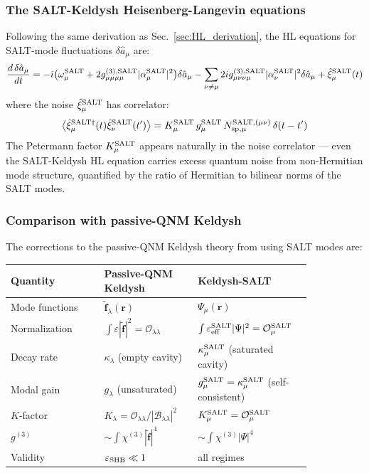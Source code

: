 \documentclass[12pt]{article}
\newcommand{\tf}{\tilde{\mathbf{f}}}
\begin{document}
\subsubsection*{The SALT-Keldysh Heisenberg-Langevin equations}

Following the same derivation as Sec.~\ref{sec:HL_derivation}, the HL
equations for SALT-mode fluctuations $\delta\hat{a}_\mu$ are:
\begin{equation}
  \frac{d\,\delta\hat{a}_\mu}{dt} =
  -i\bigl(\omega_\mu^{\rm SALT} + 2g^{(3),\rm SALT}_{\mu\mu\mu\mu}
  |\alpha_\mu^{\rm SALT}|^2\bigr)\delta\hat{a}_\mu
  - \sum_{\nu\neq\mu}
  2ig^{(3),\rm SALT}_{\mu\nu\nu\mu}|\alpha_\nu^{\rm SALT}|^2\delta\hat{a}_\mu
  + \hat{\xi}_\mu^{\rm SALT}(t)
  \label{eq:HL_SALT}
\end{equation}
where the noise $\hat{\xi}_\mu^{\rm SALT}$ has correlator:
\begin{equation}
  \bigl\langle\hat{\xi}_\mu^{{\rm SALT}\dagger}(t)
  \hat{\xi}_\nu^{\rm SALT}(t')\bigr\rangle
  = K_\mu^{\rm SALT}\,g_\mu^{\rm SALT}\,
  N_{\rm sp,\mu}^{\rm SALT,(\mu\nu)}\,\delta(t-t')
  \label{eq:HL_SALT_noise}
\end{equation}
The Petermann factor $K_\mu^{\rm SALT}$ appears naturally in the noise
correlator --- even the SALT-Keldysh HL equation carries excess quantum
noise from non-Hermitian mode structure, quantified by the ratio of
Hermitian to bilinear norms of the SALT modes.

\subsubsection*{Comparison with passive-QNM Keldysh}

The corrections to the passive-QNM Keldysh theory from using SALT modes are:

\begin{center}
\begin{tabular}{p{0.28\linewidth}p{0.28\linewidth}p{0.28\linewidth}}
\toprule
Quantity & Passive-QNM Keldysh & Keldysh-SALT \\
\midrule
Mode functions & $\tf_\lambda(\mathbf{r})$ & $\Psi_\mu(\mathbf{r})$ \\[2pt]
Normalization & $\int\varepsilon|\tf|^2=\mathcal{O}_{\lambda\lambda}$
  & $\int\varepsilon_{\rm eff}^{\rm SALT}|\Psi|^2
    =\mathcal{O}_\mu^{\rm SALT}$ \\[2pt]
Decay rate & $\kappa_\lambda$ (empty cavity)
  & $\kappa_\mu^{\rm SALT}$ (saturated cavity) \\[2pt]
Modal gain & $g_\lambda$ (unsaturated)
  & $g_\mu^{\rm SALT}=\kappa_\mu^{\rm SALT}$ (self-consistent) \\[2pt]
$K$-factor & $K_\lambda = \mathcal{O}_{\lambda\lambda}/|\mathcal{B}_{\lambda\lambda}|^2$
  & $K_\mu^{\rm SALT}=\mathcal{O}_\mu^{\rm SALT}$ \\[2pt]
$g^{(3)}$ & $\sim\int\chi^{(3)}|\tf|^4$ & $\sim\int\chi^{(3)}|\Psi|^4$ \\[2pt]
Validity & $\varepsilon_{\rm SHB}\ll 1$ & all regimes \\
\bottomrule
\end{tabular}
\end{center}
\end{document}
